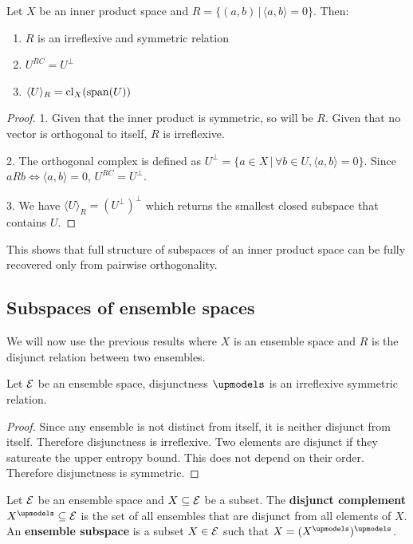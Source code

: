 \begin{prop}
	Let $X$ be an inner product space and $R = \{(a,b) \,|\, \langle a , b\rangle = 0\}$. Then:
	\begin{enumerate}
		\item $R$ is an irreflexive and symmetric relation
		\item $U^{RC} = U^{\perp}$
		\item $\langle U \rangle_R = \mathrm{cl}_X (\mathrm{span}(U))$
	\end{enumerate}
\end{prop}

\begin{proof}
	1. Given that the inner product is symmetric, so will be $R$. Given that no vector is orthogonal to itself, $R$ is irreflexive.
	
	2. The orthogonal complex is defined as $U^\perp = \{ a \in X \, | \, \forall b \in U, \langle a , b\rangle = 0 \}$. Since $aRb \iff \langle a , b\rangle = 0$, $U^{RC} = U^{\perp}$.
	
	3. We have $\langle U \rangle_R = (U^{\perp})^\perp$ which returns the smallest closed subspace that contains $U$.
\end{proof}

This shows that full structure of subspaces of an inner product space can be fully recovered only from pairwise orthogonality.

\subsection{Subspaces of ensemble spaces}

We will now use the previous results where $X$ is an ensemble space and $R$ is the disjunct relation between two ensembles.

\begin{prop}
	Let $\mathcal{E}$ be an ensemble space, disjunctness $\disjunct$ is an irreflexive symmetric relation.
\end{prop}

\begin{proof}
	Since any ensemble is not distinct from itself, it is neither disjunct from itself. Therefore disjunctness is irreflexive. Two elements are disjunct if they satureate the upper entropy bound. This does not depend on their order. Therefore disjunctness is symmetric.
\end{proof}

\begin{defn}
	Let $\mathcal{E}$ be an ensemble space and $X \subseteq \mathcal{E}$ be a subset. The \textbf{disjunct complement} $X^\disjunct \subseteq \Ens$ is the set of all ensembles that are disjunct from all elements of $X$. An \textbf{ensemble subspace} is a subset $X \in \mathcal{E}$ such that $X = (X^\disjunct)^\disjunct$.
\end{defn}

